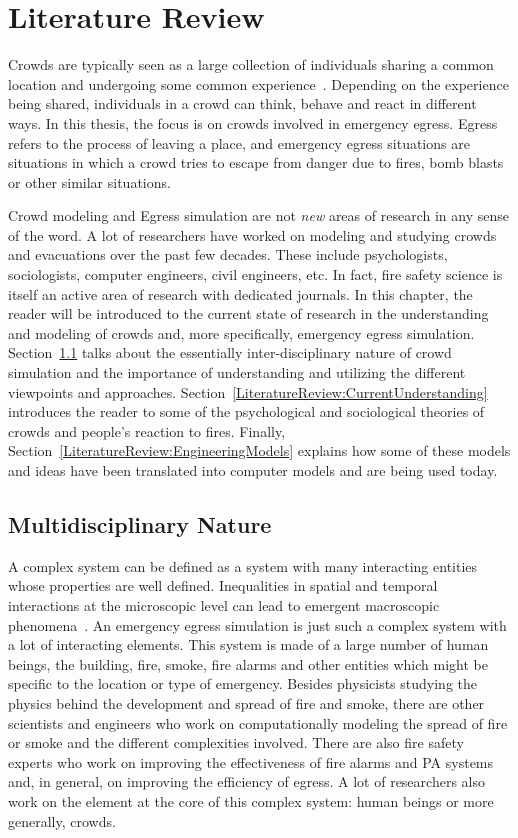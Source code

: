 
\chapter{Literature Review}
\label{chapter:LiteratureReview}

Crowds are typically seen as a large collection of individuals sharing a common location and undergoing some common experience~\cite{Aveni:1997wq}. Depending on the experience being shared, individuals in a crowd can think, behave and react in different ways. In this thesis, the focus is on crowds involved in emergency egress. Egress refers to the process of leaving a place, and emergency egress situations are situations in which a crowd tries to escape from danger due to fires, bomb blasts or other similar situations.

Crowd modeling and Egress simulation are not \emph{new} areas of research in any sense of the word. A lot of researchers have worked on modeling and studying crowds and evacuations over the past few decades. These include psychologists, sociologists, computer engineers, civil engineers, etc. In fact, fire safety science is itself an active area of research with dedicated journals. In this chapter, the reader will be introduced to the current state of research in the understanding and modeling of crowds and, more specifically, emergency egress simulation. Section~\ref{LiteratureReiew:MultidisciplinaryNature} talks about the essentially inter-disciplinary nature of crowd simulation and the importance of understanding and utilizing the different viewpoints and approaches. Section~\ref{LiteratureReview:CurrentUnderstanding} introduces the reader to some of the psychological and sociological theories of crowds and people's reaction to fires. Finally, Section~\ref{LiteratureReview:EngineeringModels} explains how some of these models and ideas have been translated into computer models and are being used today.

\section{Multidisciplinary Nature}
\label{LiteratureReiew:MultidisciplinaryNature}
A complex system can be defined as a system with many interacting entities whose properties are well defined. Inequalities in spatial and temporal interactions at the microscopic level can lead to emergent macroscopic phenomena~\cite{Sloot:1997ws}. An emergency egress simulation is just such a complex system with a lot of interacting elements. This system is made of a large number of human beings, the building, fire, smoke, fire alarms and other entities which might be specific to the location or type of emergency. Besides physicists studying the physics behind the development and spread of fire and smoke, there are other scientists and engineers who work on computationally modeling the spread of fire or smoke and the different complexities involved. There are also fire safety experts who work on improving the effectiveness of fire alarms and PA systems and, in general, on improving the efficiency of egress. A lot of researchers also work on the element at the core of this complex system: human beings or more generally, crowds.

